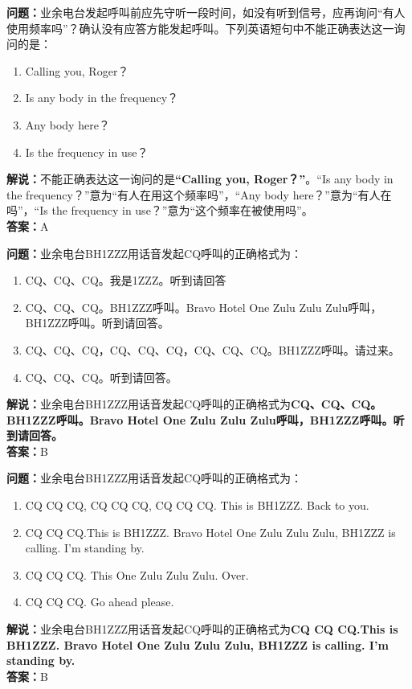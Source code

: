 \textbf{问题：}业余电台发起呼叫前应先守听一段时间，如没有听到信号，应再询问“有人使用频率吗”？确认没有应答方能发起呼叫。下列英语短句中不能正确表达这一询问的是：
\begin{enumerate}[label=\Alph*), leftmargin=1.5cm]
	\item Calling you, Roger？
	\item Is any body in the frequency？
	\item Any body here？
	\item Is the frequency in use？
\end{enumerate}
\textbf{解说：}不能正确表达这一询问的是\textbf{“Calling you, Roger？”}。“Is any body in the frequency？”意为“有人在用这个频率吗”，“Any body here？”意为“有人在吗”，“Is the frequency in use？”意为“这个频率在被使用吗”。\\\textbf{答案：}A


\textbf{问题：}业余电台BH1ZZZ用话音发起CQ呼叫的正确格式为：
\begin{enumerate}[label=\Alph*), leftmargin=1.5cm]
	\item CQ、CQ、CQ。我是1ZZZ。听到请回答
	\item CQ、CQ、CQ。BH1ZZZ呼叫。Bravo Hotel One Zulu Zulu Zulu呼叫，BH1ZZZ呼叫。听到请回答。
	\item CQ、CQ、CQ，CQ、CQ、CQ，CQ、CQ、CQ。BH1ZZZ呼叫。请过来。
	\item CQ、CQ、CQ。听到请回答。
\end{enumerate}
\textbf{解说：}业余电台BH1ZZZ用话音发起CQ呼叫的正确格式为\textbf{CQ、CQ、CQ。BH1ZZZ呼叫。Bravo Hotel One Zulu Zulu Zulu呼叫，BH1ZZZ呼叫。听到请回答。}\\\textbf{答案：}B


\textbf{问题：}业余电台BH1ZZZ用话音发起CQ呼叫的正确格式为：
\begin{enumerate}[label=\Alph*), leftmargin=1.5cm]
	\item CQ CQ CQ, CQ CQ CQ, CQ CQ CQ. This is BH1ZZZ. Back to you.
	\item CQ CQ CQ.This is BH1ZZZ. Bravo Hotel One Zulu Zulu Zulu, BH1ZZZ is calling. I’m standing by.
	\item CQ CQ CQ. This One Zulu Zulu Zulu. Over.
	\item CQ CQ CQ. Go ahead please.
\end{enumerate}
\textbf{解说：}业余电台BH1ZZZ用话音发起CQ呼叫的正确格式为\textbf{CQ CQ CQ.This is BH1ZZZ. Bravo Hotel One Zulu Zulu Zulu, BH1ZZZ is calling. I’m standing by.}\\\textbf{答案：}B



